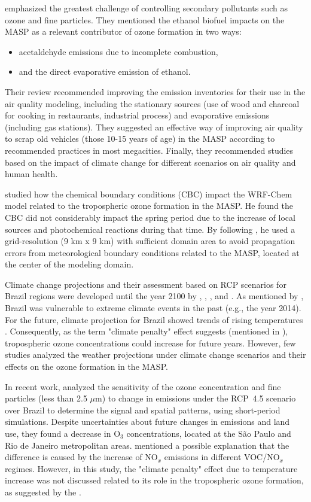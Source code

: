 \citet{Andrade2017} emphasized the greatest challenge of controlling secondary pollutants such as ozone and fine particles.
They mentioned the ethanol biofuel impacts on the MASP as a relevant contributor of ozone formation in two ways: 
\begin{itemize}
	\item acetaldehyde emissions due to incomplete combustion,
	\item and the direct evaporative emission of ethanol.
\end{itemize}
Their review recommended improving the emission inventories for their use in the air quality modeling, including the stationary sources (use of wood and charcoal for cooking in restaurants, industrial process) and evaporative emissions (including gas stations). 
They suggested an effective way of improving air quality to scrap old vehicles (those 10-15 years of age) in the MASP according to recommended practices in most megacities.
Finally, they recommended studies based on the impact of climate change for different scenarios on air quality and human health.

\citet{Gavidia2018} studied how the chemical boundary conditions (CBC) impact the WRF-Chem model related to the tropospheric ozone formation in the MASP. 
He found the CBC did not considerably impact the spring period due to the increase of local sources and photochemical reactions during that time. 
By following \citet{Warner2011}, he used a grid-resolution (9 km x 9 km) with sufficient domain area to avoid propagation errors from meteorological boundary conditions related to the MASP, located at the center of the modeling domain.

Climate change projections and their assessment based on RCP scenarios for Brazil regions were developed until the year 2100 by \citet{Chou2014}, \citet{Cunningham2017}, \citet{Marengo2018}, and \citet{Nobre2019}.
As mentioned by \citet{Nobre2019}, Brazil was vulnerable to extreme climate events in the past (e.g., the year 2014).
For the future, climate projection for Brazil showed trends of rising temperatures \citep{Nobre2019}.
Consequently, as the term "climate penalty" effect suggests (mentioned in \citealt{IPCC2013}), tropospheric ozone concentrations could increase for future years. 
However, few studies \citep{Mazzoli2013,Schuch2020} analyzed the weather projections under climate change scenarios and their effects on the ozone formation in the MASP.

In recent work, \citet{Schuch2020} analyzed the sensitivity of the ozone concentration and fine particles (less than 2.5 $\mu$m) to change in emissions under the RCP~4.5 scenario over Brazil to determine the signal and spatial patterns, using short-period simulations.
Despite uncertainties about future changes in emissions and land use, they found a decrease in O$_3$ concentrations, located at the S\~{a}o Paulo and Rio de Janeiro metropolitan areas.
\citet{Schuch2020} mentioned a possible explanation that the difference is caused by the increase of NO$_x$ emissions in different VOC/NO$_x$ regimes.
However, in this study, the "climate penalty" effect due to temperature increase was not discussed related to its role in the tropospheric ozone formation, as suggested by the \citet{IPCC2013}.

